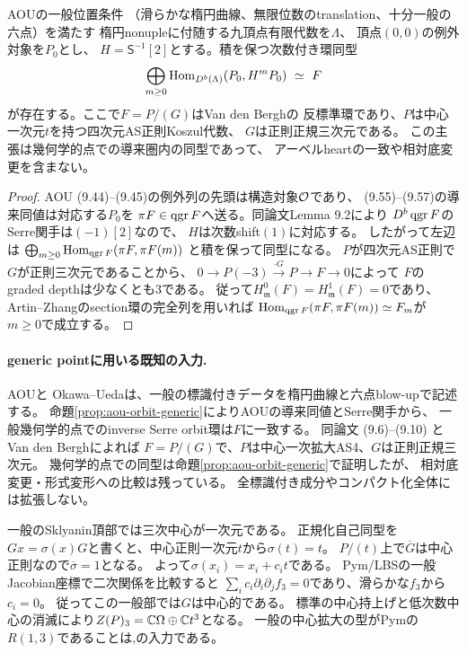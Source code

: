 \begin{proposition}\label{prop:aou-orbit-generic}
AOU\cite[\S9, Theorem 9.4]{AOU}の一般位置条件
（滑らかな楕円曲線、無限位数のtranslation、十分一般の六点）を満たす
楕円nonupleに付随する九頂点有限代数を$\Lambda$、
頂点$(0,0)$の例外対象を$P_0$とし、
$H=\mathsf S^{-1}[2]$とする。積を保つ次数付き環同型
\[
 \bigoplus_{m\ge0}\operatorname{Hom}_{D^b(\Lambda)}(P_0,H^mP_0)
 \ \simeq\ F
\]
が存在する。ここで$F=P/(G)$はVan den Bergh\cite[Chapter 12]{VdB}の
反標準環であり、$P$は中心一次元$t$を持つ四次元AS正則Koszul代数、
$G$は正則正規三次元である。
この主張は幾何学的点での導来圏内の同型であって、
アーベルheartの一致や相対底変更を含まない。
\end{proposition}
\begin{proof}
AOU (9.44)--(9.45)の例外列の先頭は構造対象$\mathcal O$であり、
(9.55)--(9.57)の導来同値は対応する$P_0$を
$\pi F\in\operatorname{qgr} F$へ送る。同論文Lemma 9.2により
$D^b\operatorname{qgr} F$のSerre関手は$(-1)[2]$なので、
$H$は次数shift$(1)$に対応する。
したがって左辺は
$\bigoplus_{m\ge0}\operatorname{Hom}_{\operatorname{qgr} F}(\pi F,\pi F(m))$
と積を保って同型になる。
$P$が四次元AS正則で$G$が正則三次元であることから、
$0\to P(-3)\xrightarrow{\cdot G}P\to F\to0$によって
$F$のgraded depthは少なくとも3である。
従って$H^0_{\mathfrak m}(F)=H^1_{\mathfrak m}(F)=0$であり、
Artin--Zhangのsection環の完全列\cite{AZ}を用いれば
$\operatorname{Hom}_{\operatorname{qgr} F}(\pi F,\pi F(m))\simeq F_m$が$m\ge0$で成立する。
\end{proof}

\paragraph{generic pointに用いる既知の入力.}
AOU\cite[Theorem 1.1, \S9, Theorem 9.4]{AOU}と
Okawa--Ueda\cite[Theorem 6.4]{OU2025}は、一般の標識付きデータを楕円曲線と六点blow-upで記述する。
命題\ref{prop:aou-orbit-generic}によりAOUの導来同値とSerre関手から、
一般幾何学的点でのinverse Serre orbit環は$F$に一致する。
同論文 (9.6)--(9.10) とVan den Bergh\cite[Chapter 12]{VdB}によれば
$F=P/(G)$で、$P$は中心一次拡大AS4、$G$は正則正規三次元。
幾何学的点での同型は命題\ref{prop:aou-orbit-generic}で証明したが、
相対底変更・形式変形への比較は残っている。
全標識付き成分やコンパクト化全体には拡張しない。

一般のSklyanin頂部では三次中心が一次元である。
正規化自己同型を$Gx=\sigma(x)G$と書くと、中心正則一次元$t$から$\sigma(t)=t$。
$P/(t)$上で$\overline G$は中心正則なので$\overline\sigma=1$となる。
よって$\sigma(x_i)=x_i+c_i t$である。
Pym/LBSの一般Jacobian座標で二次関係を比較すると
$\sum_i c_i\partial_i\partial_j f_3=0$であり、滑らかな$f_3$から$c_i=0$。
従ってこの一般部では$G$は中心的である。
標準の中心持上げと低次数中心の消滅により$Z(P)_3=\mathbb C\Omega\oplus\mathbb C t^3$となる。
一般の中心拡大の型がPymの$R(1,3)$であることは\cite[\S3.4]{Pym},\cite{LBS}の入力である。


